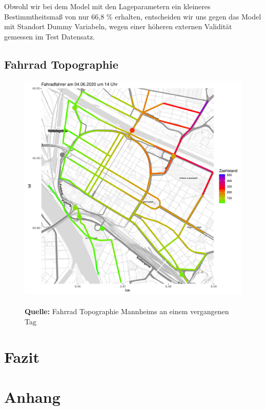 \documentclass[a4paper,12pt]{thesis}
\newcommand*{\captionsource}[2]{%
	\caption[{#1}]{%
		#1%
		\\\hspace{\linewidth}%
		\textbf{Quelle:} #2%
	}%
}
\begin{document}
Obwohl wir bei dem Model mit den Lageparametern ein kleineres Bestimmtheitsmaß von nur 66,8 \% erhalten, entscheiden wir uns gegen das Model mit Standort Dummy Variabeln, wegen einer höheren externen Validität gemessen im Test Datensatz.

\section{Fahrrad Topographie}

\begin{figure}[!ht]
	\centering
	\includegraphics[width=\textwidth]{Plots/HeatmapFinal1.pdf}
	\captionsource{}{
		Fahrrad Topographie Mannheims an einem vergangenen Tag
	}
	\label{fig:meine-grafik5}
\end{figure}


\chapter{Fazit}

\chapter{Anhang}
\end{document}
